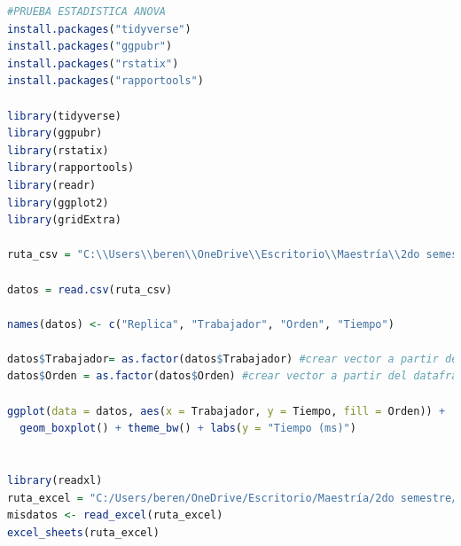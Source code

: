 \documentclass{article}
\begin{document}

\lstset{style=mystyle}
\begin{lstlisting}[language=R, caption= Código para la prueba estadística ANOVA y ANOVA Welch.]
#PRUEBA ESTADISTICA ANOVA
install.packages("tidyverse")
install.packages("ggpubr")
install.packages("rstatix")
install.packages("rapportools")

library(tidyverse)
library(ggpubr)
library(rstatix)
library(rapportools)
library(readr)
library(ggplot2)
library(gridExtra)

ruta_csv = "C:\\Users\\beren\\OneDrive\\Escritorio\\Maestría\\2do semestre\\5. Simulación computacional de nanomateriales\\Tareas\\Tarea_3\\misdatos.csv"

datos = read.csv(ruta_csv)

names(datos) <- c("Replica", "Trabajador", "Orden", "Tiempo")

datos$Trabajador= as.factor(datos$Trabajador) #crear vector a partir del dataframe
datos$Orden = as.factor(datos$Orden) #crear vector a partir del dataframe

ggplot(data = datos, aes(x = Trabajador, y = Tiempo, fill = Orden)) +
  geom_boxplot() + theme_bw() + labs(y = "Tiempo (ms)")


library(readxl)
ruta_excel = "C:/Users/beren/OneDrive/Escritorio/Maestría/2do semestre/5. Simulación computacional de nanomateriales/Tareas/Tarea_3/misdatos.xlsx"
misdatos <- read_excel(ruta_excel)
excel_sheets(ruta_excel)


\end{lstlisting}
\end{document}
